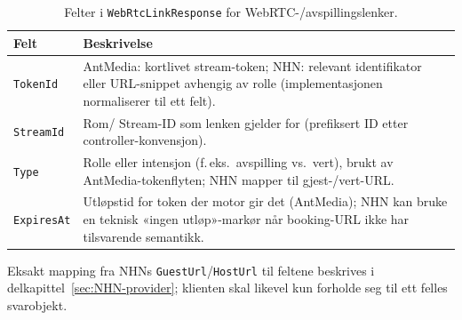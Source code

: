 \begin{table}[H]
\centering
\begin{threeparttable}
\caption{Felter i \texttt{WebRtcLinkResponse} for WebRTC-/avspillingslenker.}
\label{tab:model-webrtc}
\begin{tabular}{p{3.6cm} p{10cm}}
\toprule
\textbf{Felt} & \textbf{Beskrivelse} \\
\midrule
\texttt{TokenId} & AntMedia: kortlivet stream-token; NHN: relevant identifikator eller URL-snippet avhengig av rolle (implementasjonen normaliserer til ett felt). \\
\texttt{StreamId} & Rom/ Stream-ID som lenken gjelder for (prefiksert ID etter controller-konvensjon). \\
\texttt{Type} & Rolle eller intensjon (f.\,eks.\ avspilling vs.\ vert), brukt av AntMedia-tokenflyten; NHN mapper til gjest-/vert-URL. \\
\texttt{ExpiresAt} & Utløpstid for token der motor gir det (AntMedia); NHN kan bruke en teknisk «ingen utløp»-markør når booking-URL ikke har tilsvarende semantikk. \\
\bottomrule
\end{tabular}
\begin{tablenotes}
\footnotesize
\item Eksakt mapping fra NHNs \texttt{GuestUrl}/\texttt{HostUrl} til feltene beskrives i delkapittel~\ref{sec:NHN-provider}; klienten skal likevel kun forholde seg til ett felles svarobjekt.
\end{tablenotes}
\end{threeparttable}
\end{table}
\newpage
